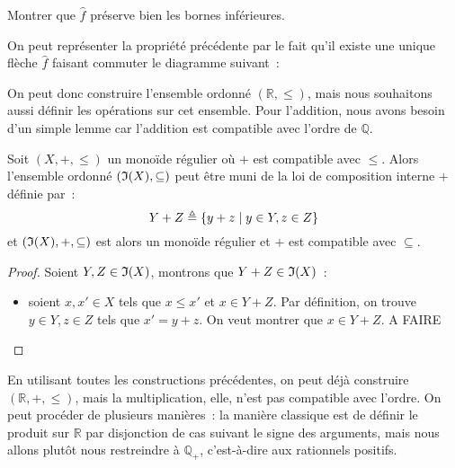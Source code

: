 \begin{exercise}
  Montrer que $\hat f$ préserve bien les bornes inférieures.
\end{exercise}

\begin{remark}
  On peut représenter la propriété précédente par le fait qu'il existe une
  unique flèche $\hat f$ faisant commuter le diagramme suivant~:
  \begin{center}
  \end{center}
\end{remark}

On peut donc construire l'ensemble ordonné $(\mathbb R,\leq)$, mais nous
souhaitons aussi définir les opérations sur cet ensemble. Pour l'addition, nous
avons besoin d'un simple lemme car l'addition est compatible avec l'ordre de
$\mathbb Q$.

\begin{lemma}\label{lem.R.compat}
  Soit $(X,+,\leq)$ un monoïde régulier où $+$ est compatible avec
  $\leq$. Alors l'ensemble ordonné $(\mathfrak{I}(X),\subseteq)$ peut être muni de
  la loi de composition interne $+$ définie par~:
  \[Y + Z \triangleq \{y + z \mid y \in Y, z \in Z\}\]
  et $(\mathfrak{I}(X),+,\subseteq)$ est alors un monoïde régulier et $+$ est
  compatible avec $\subseteq$.
\end{lemma}

\begin{proof}
  Soient $Y,Z\in \mathfrak{I}(X)$, montrons que $Y + Z \in \mathfrak{I}(X)$~:
  \begin{itemize}
  \item soient $x,x'\in X$ tels que $x\leq x'$ et $x\in Y + Z$. Par définition,
    on trouve $y\in Y,z \in Z$ tels que $x' = y + z$. On veut montrer que
    $x \in Y + Z$. A FAIRE  
  \end{itemize}
\end{proof}

En utilisant toutes les constructions précédentes, on peut déjà construire
$(\mathbb R,+,\leq)$, mais la multiplication, elle, n'est pas compatible avec
l'ordre. On peut procéder de plusieurs manières~: la manière classique est de
définir le produit sur $\mathbb R$ par disjonction de cas suivant le signe des
arguments, mais nous allons plutôt nous restreindre à $\mathbb Q_+$,
c'est-à-dire aux rationnels positifs.

